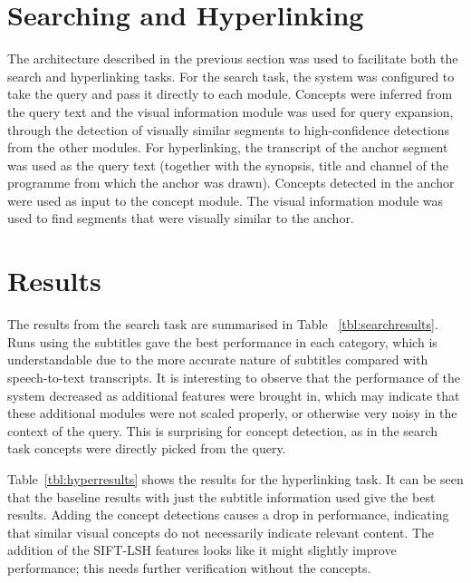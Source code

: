 \documentclass{../acm_proc_article-me11_tweaked}
\begin{document}
\section{Searching and Hyperlinking}
The architecture described in the previous section was used to facilitate both the search and hyperlinking tasks. For the search task, the system was configured to take the query and pass it directly to each module. Concepts were inferred from the 
query text and the visual information module was used for query expansion, through the detection of visually similar segments to high-confidence detections from the other modules. For hyperlinking, the transcript of the anchor segment was used as the query text (together with the synopsis, title and channel of the programme from which the anchor was drawn). Concepts detected in the anchor were used as input to the concept module. The visual information module was used to find segments that were visually similar to the anchor. 

\section{Results}
The results from the search task are summarised in Table~
\ref{tbl:searchresults}. Runs using the subtitles gave the best performance in 
each category, which is understandable due to the more accurate nature of 
subtitles compared with speech-to-text transcripts. It is interesting to 
observe that the performance of the system decreased as additional features 
were brought in, which may indicate that these additional modules were not 
scaled properly, or otherwise very noisy in the context of the query. This is 
surprising for concept detection, as in the search task concepts were directly 
picked from the query.

Table~\ref{tbl:hyperresults} shows the results for the hyperlinking 
task. It can be seen that the baseline results with just the subtitle 
information used give the best results. Adding the concept detections 
causes a drop in performance, indicating that similar visual concepts
do not necessarily indicate relevant content. The addition of the SIFT-LSH
features looks like it might slightly improve performance; this needs further verification
without the concepts.
\end{document}
